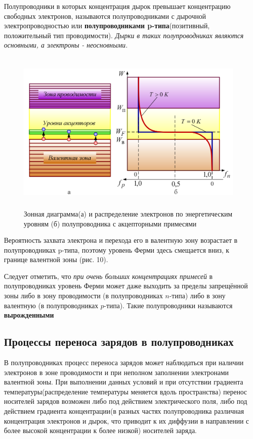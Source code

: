 	\par Полупроводники в которых концентрация дырок превышает концентрацию свободных электронов, называются полупроводниками с дырочной электропроводностью или \textbf{полупроводниками p-типа}(позитивный, положительный тип проводимости). \textit{Дырки в таких полупроводниках являются основными, а электроны - неосновными.}
	
	\begin{figure}[h]
		\centering
		\includegraphics[height=8cm]{img/11} 
		\captionsetup{font=footnotesize}
		\caption{Зонная диаграмма(а) и распределение электронов по энергетическим уровням (б) полупроводника с акцепторными примесями} 
	\end{figure}
	
	\par Вероятность захвата электрона и перехода его в валентную зону возрастает в полупроводниках p-типа, поэтому уровень Ферми здесь смещается вниз, к границе валентной зоны (рис. 10).
	\par Следует отметить, что \textit{при очень больших концентрациях примесей} в полупроводниках уровень Ферми может даже выходить за пределы запрещённой зоны либо в зону проводимости (в полупроводниках \(n\)-типа) либо в зону валентную (в полупроводниках \(p\)-типа). Такие полупроводники называются \textbf{вырожденными}

	\subsection{Процессы переноса зарядов в полупроводниках}
	
	\par В полупроводниках процесс переноса зарядов может наблюдаться при наличии электронов в зоне проводимости и при неполном заполнении электронами валентной зоны. При выполнении данных условий и при отсутствии градиента температуры(распределение температуры меняется вдоль пространства) перенос носителей зарядов возможен либо под действием электрического поля, либо под действием градиента концентрации(в разных частях полупроводника различная концентрация электронов и дырок, что приводит к их диффузии в направлении с более высокой концентрации к более низкой) носителей заряда.
	
